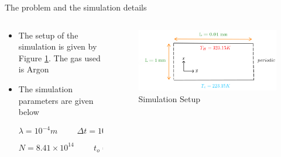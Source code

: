 \documentclass{beamer}
\begin{document}
        \begin{frame}{The problem and the simulation details}
            \begin{columns}
                \begin{column}{0.5\linewidth}
                    \begin{itemize}
                        \setlength\itemsep{0.25cm}
                                
                        \item<1->The setup of the simulation is given by Figure \ref{img:Setup}. The gas used is Argon

                        \item<2->The simulation parameters are given below \cite{rader2005dsmc}

                            \begin{equation*}
                                \lambda = 10^{-4} m \hspace{1cm} \Delta t = 10^{-8} s
                            \end{equation*}

                            \begin{equation*}
                                N = 8.41 \times 10^{14} \hspace{1cm} t_o = 71 ns
                            \end{equation*}
                    \end{itemize}                    
                \end{column} 
            
                \begin{column}{0.5\linewidth}
                    \begin{figure}
                        \centering
                        \includegraphics[width=\linewidth]{Pictures/1D_Fourier_Flow/Setup.png}
                        \caption{Simulation Setup}
                        \label{img:Setup}
                    \end{figure}
                \end{column}
            \end{columns}
        \end{frame}
\end{document}
